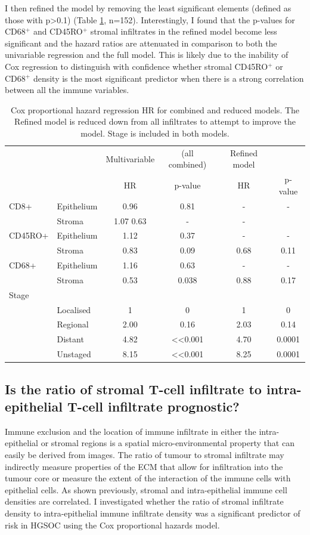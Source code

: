 I then refined the model by removing the least significant elements (defined as those with p>0.1) (Table \ref{tab:cox_combined}, n=152). Interestingly, I found that the p-values for CD68$^+$ and CD45RO$^+$ stromal infiltrates in the refined model become less significant and the hazard ratios are attenuated in comparison to both the univariable regression and the full model. This is likely due to the inability of Cox regression to distinguish with confidence whether stromal CD45RO$^+$ or CD68$^+$ density is the most significant predictor when there is a strong correlation between all the immune variables.
\begin{table}[]
    \centering
    \begin{tabular}{llcccc} \hline
&&	Multivariable & (all combined) &	Refined model &\\ 
	&&	HR&	p-value&	HR&	p-value\\ \hline
CD8+&	Epithelium&	0.96&	0.81&	-	&-\\
	&Stroma&	1.07	0.63	&-&	-\\
CD45RO+&	Epithelium&	1.12&	0.37	&-&	-\\
	&Stroma	&0.83	&0.09	&0.68&	0.11\\
CD68+&	Epithelium&	1.16&	0.63	&-&	-\\
	&Stroma	&0.53&	0.038&	0.88	&0.17\\
Stage &&&&&\\
&Localised&	1&	0&	1&	0\\
&	Regional&	2.00&	0.16&	2.03&	0.14\\
&	Distant&	4.82&	<<0.001&	4.70&	0.0001\\
&	Unstaged	&8.15&	<<0.001&	8.25&	0.0001\\ \hline

    \end{tabular}
    \caption[Cox regression HR and p-values for combined and reduced survival models.]{Cox proportional hazard regression HR for combined and reduced models. The Refined model is reduced down from all infiltrates to attempt to improve the model. Stage is included in both models.}
    \label{tab:cox_combined}
\end{table}

\subsection{Is the ratio of stromal T-cell infiltrate to intra-epithelial T-cell infiltrate prognostic?}

Immune exclusion and the location of immune infiltrate in either the intra-epithelial or stromal regions is a spatial micro-environmental property that can easily be derived from images. The ratio of tumour to stromal infiltrate may indirectly measure properties of the ECM that allow for infiltration into the tumour core or measure the extent of the interaction of the immune cells with epithelial cells. As shown previously, stromal and intra-epithelial immune cell densities are correlated. I investigated whether the ratio of stromal infiltrate density to intra-epithelial immune infiltrate density was a significant predictor of risk in HGSOC using the Cox proportional hazards model.

